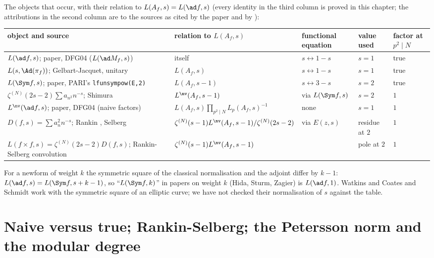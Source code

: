 \begin{remark}\label{rem:lfunctions:normalisations}
The objects that occur, with their relation to $L(A_f,s)=L(\ad f,s)$ (every identity in the third column is proved in this chapter; the attributions in the
second column are to the sources as cited by the paper and by ):
\begin{center}\footnotesize\setlength{\tabcolsep}{4pt}
\begin{tabular}{@{}p{3.6cm}p{4.6cm}p{2.2cm}p{1.6cm}p{1.6cm}@{}}
\toprule
object and source & relation to $L(A_f,s)$ & functional equation & value used & factor at $p^2\mid N$\\
\midrule
$L(\ad f,s)$; paper, DFG04 ($L(\ad M_f,s)$) & itself & $s\leftrightarrow1-s$ & $s=1$ & true\\
$L(s,\Ad(\pi_f))$; Gelbart-Jacquet, unitary & $L(A_f,s)$ & $s\leftrightarrow1-s$ & $s=1$ & true\\
$L(\Sym f,s)$; paper, PARI's \texttt{lfunsympow(E,2)} & $L(A_f,s-1)$ & $s\leftrightarrow3-s$ & $s=2$ & true\\
$\zeta^{(N)}(2s-2)\sum a_{n^2}n^{-s}$; Shimura \cite{Shimura75} & $L^{\nv}(A_f,s-1)$ & via $L(\Sym f,s)$ & $s=2$ & $1$\\
$L^{\nv}(\ad f,s)$; paper, DFG04 (naive factors) & $L(A_f,s)\prod_{p^2\mid N}L_p(A_f,s)^{-1}$ & none & $s=1$ & $1$\\
$D(f,s)=\sum a_n^2n^{-s}$; Rankin \cite{Rankin39}, Selberg \cite{Selberg40} & $\zeta^{(N)}(s-1)L^{\nv}(A_f,s-1)/\zeta^{(N)}(2s-2)$ & via $E(z,s)$ & residue at $2$ & $1$\\
$L(f\times f,s)=\zeta^{(N)}(2s-2)D(f,s)$; Rankin-Selberg convolution & $\zeta^{(N)}(s-1)L^{\nv}(A_f,s-1)$ & & pole at $2$ & $1$\\
\bottomrule
\end{tabular}
\end{center}
For a newform of weight $k$ the symmetric square of the classical normalisation and the adjoint differ by $k-1$: $L(\ad f,s)=L(\Sym f,s+k-1)$, so ``$L(\Sym f,k)$''
in papers on weight $k$ (Hida, Sturm, Zagier) is $L(\ad f,1)$. Watkins \cite{Watkins02} and Coates and Schmidt \cite{CoatesSchmidt87} work with the symmetric square of an
elliptic curve; we have not checked their normalisation of $s$ against the table.
\end{remark}

\section[Naive versus true; the Petersson norm]{Naive versus true; Rankin-Selberg; the Petersson norm and the modular degree}\label{sec:lfunctions:rankin}

